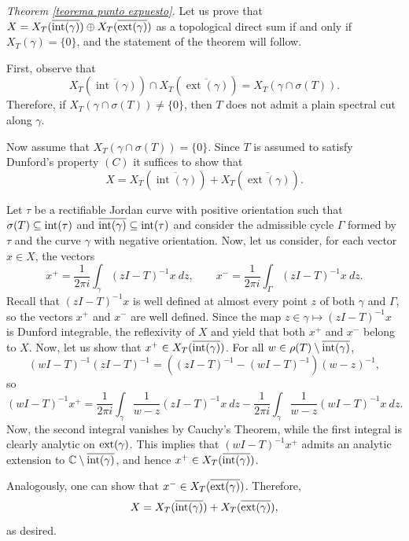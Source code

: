 \documentclass[11pt]{amsart}
\theoremstyle{definition}
\newenvironment{demode}
{\noindent {{\it Proof of }}}%
{\par \hfill \fbox{}}
\theoremstyle{remark}
\numberwithin{equation}{section}
\newcommand{\C}{\mathbb{C}}
\newcommand{\inte}{\textnormal{int}}
\newcommand{\exte}{\textnormal{ext}}
\begin{document}
\medskip

\begin{demode}\emph{ Theorem \ref{teorema punto expuesto}.}
Let us prove that $X= X_T(\overline{\inte(\gamma)})\oplus X_T(\overline{\exte(\gamma)})$ as a topological direct sum if and only if $X_T(\gamma)=\{0\}$, and the statement of the theorem will follow.

First, observe that
$$
X_T(\overline{\operatorname{int}(\gamma)}) \cap X_T(\overline{\operatorname{ext}(\gamma)})
= X_T(\gamma \cap \sigma(T)).
$$
Therefore, if $X_T(\gamma \cap \sigma(T)) \neq \{0\}$, then $T$ does not admit a plain spectral cut along $\gamma$.


\smallskip

Now assume that $X_T(\gamma \cap \sigma(T)) = \{0\}$. Since $T$ is assumed to satisfy Dunford's property $(C)$ it suffices to show that
$$
X = X_T(\overline{\operatorname{int}(\gamma)}) + X_T(\overline{\operatorname{ext}(\gamma)}).
$$


\smallskip

Let $\tau$  be a rectifiable Jordan curve with positive orientation such that $\sigma(T)\subseteq \inte(\tau)$ and $\overline{\inte(\gamma)}\subseteq \inte(\tau)$ and consider the admissible cycle $\Gamma$ formed by $\tau$ and the curve $\gamma$ with negative orientation. Now, let us consider, for each vector $x\in X$, the vectors
$$
x^+ = \frac{1}{2\pi i} \int_\gamma (z I-T)^{-1}x\ dz, \qquad x^- = \frac{1}{2\pi i} \int_\Gamma (z I-T)^{-1}x\ dz.
$$
Recall that $(z I-T)^{-1}x$ is well defined at almost every point $z$ of both $\gamma$ and $\Gamma$, so the vectors $x^+$ and $x^-$ are well defined.
Since the map $z\in \gamma \mapsto (z I-T)^{-1}x$ is Dunford integrable, the reflexivity of $X$ and \cite[Theorem 11.55]{AB} yield that both $x^+$ and $x^-$ belong to $X$.  Now, let us show that $x^+ \in X_T(\overline{\inte(\gamma)})$. For all $w\in \rho(T)\setminus \overline{\inte(\gamma)}$,
$$(w I-T)^{-1}(z I-T)^{-1} = ( (z I-T)^{-1}-(w I-T)^{-1})(w-z)^{-1},$$
so
$$
(w I-T)^{-1}x^+ = \frac{1}{2\pi i}\int_{\gamma} \frac{1}{w-z}(z I-T)^{-1}x \ dz - \frac{1}{2\pi i}\int_{\gamma} \frac{1}{w-z}(w I-T)^{-1}x \ dz.
$$
Now, the second integral vanishes by Cauchy's Theorem, while the first integral is clearly analytic on $\exte(\gamma)$. This implies that $(w I-T)^{-1}x^+$ admits an analytic extension to $\C \setminus \overline{\inte(\gamma)}$, and hence $x^+ \in X_T(\overline{\inte(\gamma)})$.

Analogously, one can show that $x^- \in X_T(\overline{\exte(\gamma)})$. Therefore,
$$
X = X_T(\overline{\inte(\gamma)}) + X_T(\overline{\exte(\gamma)}),
$$
as desired.


\end{demode}
\end{document}
